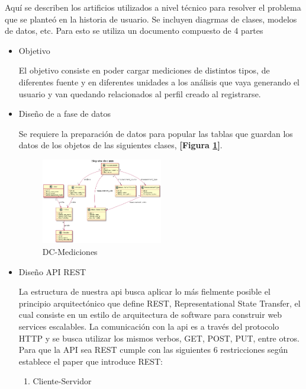 \documentclass[a4paper,12pt]{article}
\begin{document}
Aquí se describen los artificios utilizados a nivel técnico para resolver el problema que se planteó en la historia de usuario. Se incluyen diagrmas de clases, modelos de datos, etc. Para esto se utiliza un documento compuesto de 4 partes
\begin{itemize}
\item Objetivo

El objetivo consiste en poder cargar mediciones de distintos tipos, de diferentes fuente y en diferentes unidades a los análisis que vaya generando el usuario y van quedando relacionados al perfil creado al registrarse.

\item Diseño de a fase de datos

Se requiere la preparación de datos para popular las tablas que guardan los datos de los objetos de las siguientes clases, \textbf{[Figura \ref{clases-doc-prog}]}.

    \begin{figure}[h]
        \centering
        \includegraphics[width=0.5\textwidth]{img/dc_mediciones}
        \caption{DC-Mediciones}
		\label{clases-doc-prog}
    \end{figure}

\newpage

\item Diseño API REST


La estructura de nuestra api busca aplicar lo más fielmente posible el principio arquitectónico que define  REST, Representational State Transfer, el cual consiste en un estilo de arquitectura de software para construir web services escalables. La comunicación con la api es a través del protocolo HTTP y se busca utilizar los mismos verbos, GET, POST, PUT, entre otros. Para que la API sea REST cumple con las siguientes 6 restricciones según establece el paper que introduce REST:
\begin{enumerate}
	\item Cliente-Servidor
    

\end{enumerate}
\end{itemize}
\end{document}
